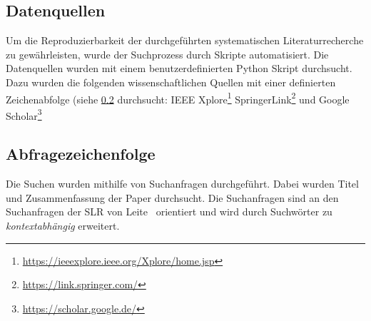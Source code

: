 \documentclass[conference,compsoc,ngerman]{IEEEtran}
\begin{document}
%
%
%
%


\subsection{Datenquellen}\label{ss:datenquellen}
Um die Reproduzierbarkeit der durchgeführten systematischen Literaturrecherche zu gewährleisten, wurde der Suchprozess durch Skripte automatisiert. Die Datenquellen wurden mit einem benutzerdefinierten Python Skript durchsucht. Dazu wurden die folgenden wissenschaftlichen Quellen mit einer definierten Zeichenabfolge (siehe \cref{section:suchanfrage} durchsucht: IEEE Xplore\footnote{\url{https://ieeexplore.ieee.org/Xplore/home.jsp}} SpringerLink\footnote{\url{https://link.springer.com/}} und Google Scholar\footnote{\url{https://scholar.google.de/}}


\subsection{Abfragezeichenfolge}
\label{section:suchanfrage}
Die Suchen wurden mithilfe von Suchanfragen durchgeführt. Dabei wurden Titel und Zusammenfassung der Paper durchsucht.
Die Suchanfragen sind an den Suchanfragen der SLR von Leite~\cite{leite2013systematic} orientiert und wird durch Suchwörter zu \textit{kontextabhängig} erweitert.
\end{document}
